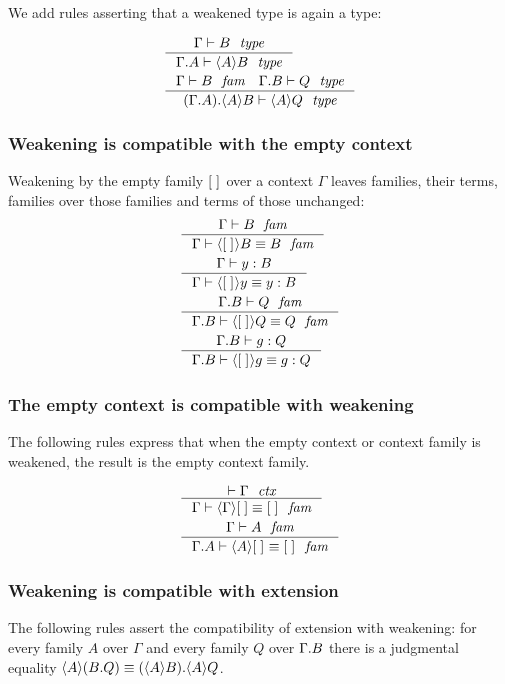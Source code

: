 We add rules asserting that a weakened type is again a type:

\begin{align}
& \inference{\jtype{\Gamma}{B}}{\jtype{\ctxext{\Gamma}{A}}{\ctxwk{A}{B}}}\\
& \inference{\jfam{\Gamma}{B}\quad\jtype{\ctxext{\Gamma}{B}}{Q}}{\jtype{\ctxext{{\Gamma}{A}}{\ctxwk{A}{B}}}{\ctxwk{A}{Q}}}
\end{align}

\subsubsection{Weakening is compatible with the empty context}

Weakening by the empty family ${[\;]}_{}$ over a context $\Gamma$ leaves families, 
their terms, families over those families and
terms of those unchanged:
\begin{align}
& \inference{\jfam{\Gamma}{B}}{\jfameq{\Gamma}{\ctxwk{\emptyf}{B}}{B}}\\
& \inference{\jterm{\Gamma}{B}{y}}{\jtermeq{\Gamma}{B}{\ctxwk{\emptyf}{y}}{y}}\\
& \inference{\jfam{\ctxext{\Gamma}{B}}{Q}}{\jfameq{\ctxext{\Gamma}{B}}{\ctxwk{\emptyf}{Q}}{Q}}\\
& \inference{\jterm{\ctxext{\Gamma}{B}}{Q}{g}}{\jtermeq{\ctxext{\Gamma}{B}}{Q}{\ctxwk{\emptyf}{g}}{g}}
\end{align}

\subsubsection{The empty context is compatible with weakening}
The following rules express that when the empty context or context family is
weakened, the result is the empty context family.

\begin{align}
& \inference{\jctx{\Gamma}}{\jfameq{\Gamma}{\ctxwk{\Gamma}{\emptyc}}{\emptyf}}\\
& \inference{\jfam{\Gamma}{A}}{\jfameq{\ctxext{\Gamma}{A}}{\ctxwk{A}{\emptyf}}{\emptyf}}
\end{align}

\subsubsection{Weakening is compatible with extension}\label{comp-we}

The following rules assert the compatibility of extension with weakening: for
every family $A$ over $\Gamma$ and every family $Q$ over $\ctxext{\Gamma}{B}$
there is a
judgmental equality $\ctxwk{A}{\ctxext{B}{Q}}\jdeq\ctxext{\ctxwk{A}{B}}
{\ctxwk{A}{Q}}$. 

